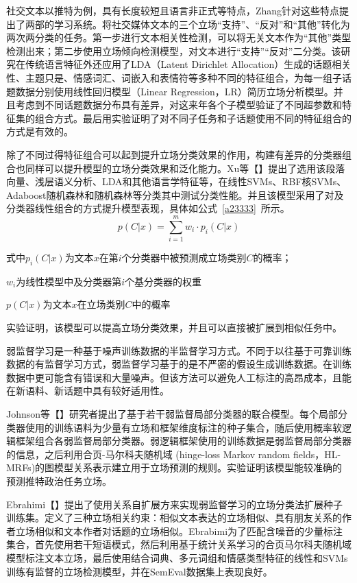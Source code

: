 社交文本以推特为例，具有长度较短且语言非正式等特点，Zhang针对这些特点提出了两部的学习系统。将社交媒体文本的三个立场“支持”、“反对”和“其他”转化为两次两分类的任务。第一步进行文本相关性检测，可以将无关文本作为“其他”类型检测出来；第二步使用立场倾向检测模型，对文本进行“支持”“反对”二分类。该研究在传统语言特征外还应用了LDA（Latent Dirichlet Allocation）生成的话题相关性、主题只是、情感词汇、词嵌入和表情符等多种不同的特征组合，为每一组子话题数据分别使用线性回归模型（Linear Regression，LR）简历立场分析模型。并且考虑到不同话题数据分布具有差异，对这来年各个子模型验证了不同超参数和特征集的组合方式。最后用实验证明了对不同子任务和子话题使用不同的特征组合的方式是有效的。

除了不同过得特征组合可以起到提升立场分类效果的作用，构建有差异的分类器组合也同样可以提升模型的立场分类效果和泛化能力。Xu等【】提出了选用该段落向量、浅层语义分析、LDA和其他语言学特征等，在线性SVMs、RBF核SVMs、Adaboost随机森林和随机森林等分类其中测试分类性能。并且该模型采用了对及分类器线性组合的方式提升模型表现，具体如公式~\ref{a23333}~所示。
\begin{equation}\label{a23333}
p(C|x)=\sum_{i=1}^m w_i \cdot p_i(C|x)
\end{equation}

式中$p_i(C|x)$为文本$x$在第$i$个分类器中被预测成立场类别$C$的概率；

$w_i$为线性模型中及分类器第$i$个基分类器的权重

$p(C|x)$为文本$x$在立场类别$C$中的概率

实验证明，该模型可以提高立场分类效果，并且可以直接被扩展到相似任务中。


弱监督学习是一种基于噪声训练数据的半监督学习方式。不同于以往基于可靠训练数据的有监督学习方式，弱监督学习基于的是不严密的假设生成训练数据。在训练数据中更可能含有错误和大量噪声。但该方法可以避免人工标注的高昂成本，且能在新语料、新话题中具有较好适用性。

Johnson等【】研究者提出了基于若干弱监督局部分类器的联合模型。每个局部分类器使用的训练语料为少量有立场和框架维度标注的种子集合，随后使用概率软逻辑框架组合各弱监督局部分类器。弱逻辑框架使用的训练数据是弱监督局部分类器的信息，之后利用合页-马尔科夫随机域 (hinge-loss Markov random fields，HL- MRFs)的图模型关系表示建立用于立场预测的规则。实验证明该模型能较准确的预测推特政治任务立场。

Ebrahimi【】提出了使用关系自扩展方来实现弱监督学习的立场分类法扩展种子训练集。定义了三种立场相关约束：相似文本表达的立场相似、具有朋友关系的作者立场相似和文本作者对话题的立场相似。Ebrabimi为了匹配含噪音的少量标注集合，首先使用若干短语模式，然后利用基于统计关系学习的合页马尔科夫随机域模型标注文本立场，最后使用结合词典、多元词组和情感类型特征的线性和SVMs训练有监督的立场检测模型，并在SemEval数据集上表现良好。

